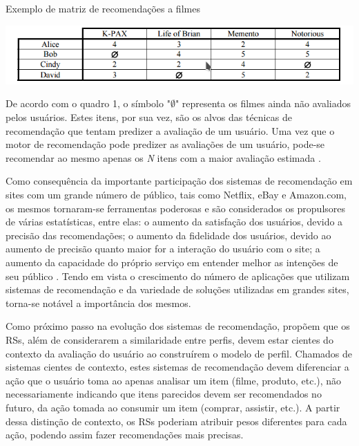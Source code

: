 \documentclass[12pt, openright, oneside, a4paper, brazil]{abntex2}
\begin{document}
\begin{quadro}[h!tp]

	\caption{\label{movie_matrix}Exemplo de matriz de recomendações a filmes}

	\begin{center}
		\includegraphics[scale=0.8]{images/movie_matrix.png}
	\end{center}


\end{quadro}

De acordo com o quadro 1, o símbolo "$\emptyset$" representa os filmes ainda não avaliados pelos usuários. Estes itens, por sua vez, são os alvos das técnicas de recomendação que tentam predizer a avaliação de um usuário. Uma vez que o motor de recomendação pode predizer as avaliações de um usuário, pode-se recomendar ao mesmo apenas os \emph{N} itens com a maior avaliação estimada \cite{adomavicius2005toward}.

Como consequência da importante participação dos sistemas de recomendação em sites com um grande número de público, tais como Netflix, eBay e Amazon.com, os mesmos tornaram-se ferramentas poderosas \cite{schafer1999recommender} e são considerados os propulsores de várias estatísticas, entre elas: o aumento da satisfação dos usuários, devido a precisão das recomendações; o aumento da fidelidade dos usuários, devido ao aumento de precisão quanto maior for a interação do usuário com o site; a aumento da capacidade do próprio serviço em entender melhor as intenções de seu público \cite{ricci2011introduction}. Tendo em vista o crescimento do número de aplicações que utilizam sistemas de recomendação e da variedade de soluções utilizadas em grandes sites, torna-se notável a importância dos mesmos.

Como próximo passo na evolução dos sistemas de recomendação,  propõem que os RSs, além de considerarem a similaridade entre perfis, devem estar cientes do contexto da avaliação do usuário ao construírem o modelo de perfil. Chamados de sistemas cientes de contexto, estes sistemas de recomendação devem diferenciar a ação que o usuário toma ao apenas analisar um item (filme, produto, etc.), não necessariamente indicando que itens parecidos devem ser recomendados no futuro, da ação tomada ao consumir um item (comprar, assistir, etc.). A partir dessa distinção de contexto, os RSs poderiam atribuir pesos diferentes para cada ação, podendo assim fazer recomendações mais precisas.
\end{document}
